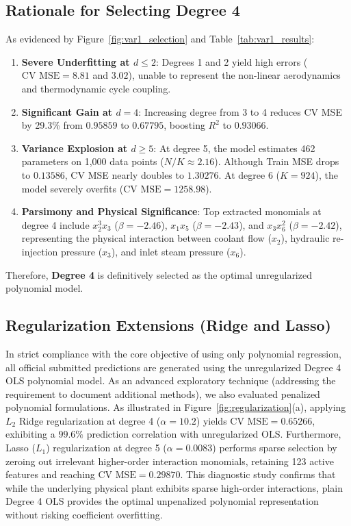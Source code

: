\documentclass[10pt,twocolumn,a4paper]{article}
\begin{document}
\subsection{Rationale for Selecting Degree 4}
As evidenced by Figure~\ref{fig:var1_selection} and Table~\ref{tab:var1_results}:
\begin{enumerate}
    \item \textbf{Severe Underfitting at $d \le 2$}: Degrees 1 and 2 yield high errors ($\text{CV MSE} = 8.81$ and $3.02$), unable to represent the non-linear aerodynamics and thermodynamic cycle coupling.
    \item \textbf{Significant Gain at $d=4$}: Increasing degree from 3 to 4 reduces CV MSE by 29.3\% from $0.95859$ to $0.67795$, boosting $R^2$ to $0.93066$.
    \item \textbf{Variance Explosion at $d \ge 5$}: At degree 5, the model estimates 462 parameters on 1,000 data points ($N/K \approx 2.16$). Although Train MSE drops to $0.13586$, CV MSE nearly doubles to $1.30276$. At degree 6 ($K=924$), the model severely overfits ($\text{CV MSE} = 1258.98$).
    \item \textbf{Parsimony and Physical Significance}: Top extracted monomials at degree 4 include $x_2^3 x_3$ ($\beta = -2.46$), $x_1 x_5$ ($\beta = -2.43$), and $x_3 x_6^2$ ($\beta = -2.42$), representing the physical interaction between coolant flow ($x_2$), hydraulic re-injection pressure ($x_3$), and inlet steam pressure ($x_6$).
\end{enumerate}
Therefore, \textbf{Degree 4} is definitively selected as the optimal unregularized polynomial model.

\subsection{Regularization Extensions (Ridge and Lasso)}
In strict compliance with the core objective of using only polynomial regression, all official submitted predictions are generated using the unregularized Degree 4 OLS polynomial model. As an advanced exploratory technique (addressing the requirement to document additional methods), we also evaluated penalized polynomial formulations. As illustrated in Figure~\ref{fig:regularization}(a), applying $L_2$ Ridge regularization at degree 4 ($\alpha = 10.2$) yields $\text{CV MSE} = 0.65266$, exhibiting a $99.6\%$ prediction correlation with unregularized OLS. Furthermore, Lasso ($L_1$) regularization at degree 5 ($\alpha = 0.0083$) performs sparse selection by zeroing out irrelevant higher-order interaction monomials, retaining 123 active features and reaching $\text{CV MSE} = 0.29870$. This diagnostic study confirms that while the underlying physical plant exhibits sparse high-order interactions, plain Degree 4 OLS provides the optimal unpenalized polynomial representation without risking coefficient overfitting.
\end{document}

